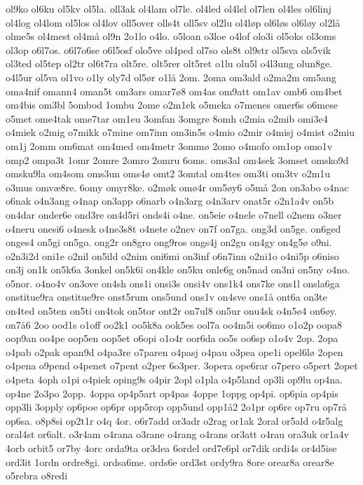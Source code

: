 {ol9ko
ol6ku
ol5kv
ol5la.
oll3ak
ol4lam
ol7le.
ol4led
ol4lel
ol7len
ol4les
ol6linj
ol4log
ol4lom
ol5los
ol4lov
oll5over
olls4t
oll5sv
ol2lu
ol4l^^f8p
ol6l^^f8s
ol6l^^f8y
ol2l^^e5
olme5s
ol4mest
ol4m^^e5
ol9n
2o1lo
o4lo.
o5loan
o3loe
o4lof
olo3i
ol5oks
ol3oms
ol3op
o6l7os.
o6l7o6se
o6l5osf
olo5ve
ol4ped
ol7so
ols8t
ol9str
ol5sva
ols5vik
ol3ted
ol5tep
ol2tr
ol6t7ra
olt5re.
olt5rer
olt5ret
o1lu
olu5l
o4l3ung
olun8ge.
o4l5ur
ol5va
ol1vo
o1ly
oly7d
ol5^^f8r
o1l^^e5
2om.
2oma
om3ald
o2ma2m
om5ang
oma4nif
omann4
oman5t
om3ars
omar7^^f88
om4as
om9att
om1av
omb6
om4bet
om4bis
om3bl
5ombod
1ombu
2ome
o2m1ek
o5meka
o7menes
omer6s
o6mese
o5met
ome4tak
ome7tar
om1eu
3omfan
3omgre
8omh
o2mia
o2mib
omi3e4
o4miek
o2mig
o7mikk
o7mine
om7inn
om3in5s
o4mio
o2mir
o4misj
o4mist
o2miu
om1j
2omm
om6mat
om4med
om4metr
3omm^^f8
2omo
o4mofo
om1op
omo1v
omp2
ompa3t
1omr
2omre
2omro
2omru
6oms.
oms3al
om4sek
3omset
omsko9d
omsku9la
om4som
oms3un
oms4^^f8
omt2
3omtal
om4tes
om3ti
om3tv
o2m1u
o3mus
omv^^e68re.
6omy
omyr8ke.
o2m^^f8k
om^^f84r
om5^^f8y6
o5m^^e5
2on
on3abo
o4nac
o6nak
o4n3ang
o4nap
on3app
o6narb
o4n3arg
o4n3arv
onat5r
o2n1a4v
on5b
on4dar
onder6e
ond3re
on4d5ri
onds4i
o4ne.
on5eie
o4nele
o7nell
o2nem
o3ner
o4neru
onesi6
o4nesk
o4ne3s8t
o4nete
o2nev
on7f
on7ga.
ong3d
on5ge.
on6ged
onges4
on5gi
on5go.
ong2r
on8gro
ong9ros
ongs4j
on2gu
on4gy
on4g5^^f8
o9ni.
o2n3i2d
oni1e
o2nil
on5ild
o2nim
oni6mi
on3inf
o6n7inn
o2ni1o
o4ni5p
o6niso
on3j
on1k
on5k6a
3onkel
on5k6i
on4kle
on5ku
onle6g
on5nad
on3ni
on5ny
o4no.
o5nor.
o4no4v
on3ove
on4sh
ons1i
onsi3s
onsi4v
ons1k4
ons7ke
ons1l
onsla6ga
onstitue9ra
onstitue9re
onst5rum
ons5und
ons1v
on4sve
ons1^^e5
ont6a
on3te
on4ted
on5ten
on5ti
on4tok
on5tor
ont2r
on7ul8
on5ur
onu4sk
o4n5^^f84
on6^^f8y.
on7^^e56
2oo
ood1s
o1off
oo2k1
oo5k8a
ook5es
ool7a
oo4m5i
oo6mo
o1o2p
oopa8
oop9an
oo4pe
oop5en
oop5et
o6opi
o1o4r
oor6da
oo5s
oo6sp
o1o4v
2op.
2opa
o4pab
o2pak
opan9d
o4pa3re
o7paren
o4pasj
o4pau
o3pea
ope1i
opel6l^^f8
2open
o4pena
o9pend
o4penet
o7pent
o2per
6o3per.
3opera
ope6rar
o7pero
o5pert
2opet
o4peta
4oph
o1pi
o4piek
oping9s
o4pir
2opl
o1pla
o4p5land
op3li
op9lu
op4na.
op4ne
2o3po
2opp.
4oppa
op4p5art
op4pas
4oppe
1oppg
op4pi.
op6pia
op4pis
opp3li
3opply
op6poe
op6pr
opp5rop
opp5und
opp1^^e52
2o1pr
op6re
op7ru
op7r^^e5
op6sa.
o8p8si
op2t1r
o4q
4or.
o6r7add
or3adr
o2rag
or1ak
2oral
or5ald
o4r5alg
oral4st
or6alt.
o3r4am
o4rana
o3rane
o4rang
o4rans
or3att
o4rau
ora3uk
or1a4v
4orb
orbit5
or7by
4orc
orda9ta
or3dea
6ordel
ord7e6pl
or7dik
ordi4s
or4d5ise
ord3it
1ordn
ordre8gi.
ordsa6me.
ords6e
ord3st
ordy9ra
8ore
orear8a
orear8e
o5rebra
o8redi
}

